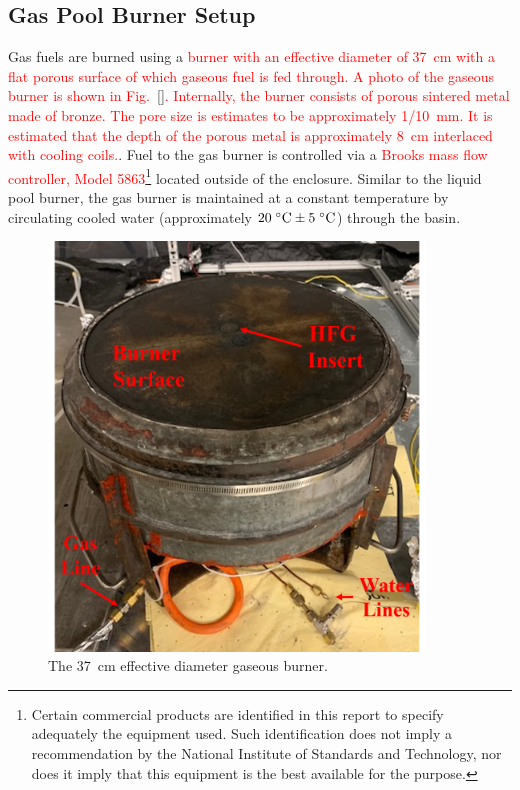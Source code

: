 \documentclass[12pt]{article}
\begin{document}
\subsection{Gas Pool Burner Setup}
\label{ssec:Gas_Pool_Burner_Setup}
Gas fuels are burned using a \textcolor{red}{burner with an effective diameter of 37~cm with a flat porous surface of which gaseous fuel is fed through. A photo of the gaseous burner is shown in Fig.~\ref{}. Internally, the burner consists of porous sintered metal made of bronze. The pore size is estimates to be approximately 1/10~mm. It is estimated that the depth of the porous metal is approximately 8~cm interlaced with cooling coils.}. Fuel to the gas burner is controlled via a \textcolor{red}{Brooks mass flow controller, Model 5863}\footnote{\label{fn:product} Certain commercial products are identified in this report to specify adequately the equipment used. Such identification does not imply a recommendation by the National Institute of Standards and Technology, nor does it imply that this equipment is the best available for the purpose.} located outside of the enclosure. Similar to the liquid pool burner, the gas burner is maintained at a constant temperature by circulating cooled water (approximately $20 \; ^\circ \hbox{C} \pm 5 \; ^\circ \hbox{C}$) through the basin.

\begin{figure}[h!]
	\centering
\includegraphics[width=10.0cm,keepaspectratio]{Gas_Burner.png}
	\caption[Photograph of the gaseous burner]{The 37~cm effective diameter gaseous burner.}
	\label{fig:Pool Burner}
\end{figure}
\end{document}
